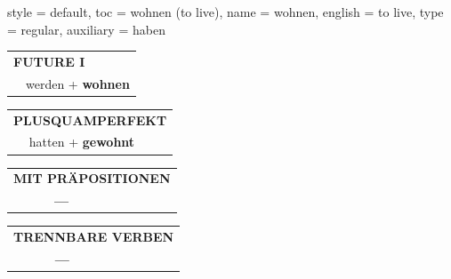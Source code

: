 \begin{verbentry}{
  style = {default},
  toc = {wohnen (to live)},
  name = {wohnen},
  english = {to live},
  type = {regular},
  auxiliary = {haben}
}
\begin{tabular}{rl}
    \multicolumn{2}{l}{\textbf{FUTURE I} }\\
  &  werden + \textbf{wohnen}\\
 
  \end{tabular}
\hfill
   \begin{tabular}{rl}
      \multicolumn{2}{l}{\textbf{PLUSQUAMPERFEKT}}\\
   & hatten + \textbf{gewohnt}\\
  \end{tabular}
  
  \vspace{10pt}



\begin{tabular}{lll}
\multicolumn{3}{l}{\textbf{MIT PRÄPOSITIONEN}}\\
& \textbf{---} & \\
\end{tabular}
\hfill
\begin{tabular}{lll}
\multicolumn{3}{l}{\textbf{TRENNBARE VERBEN}}\\
& \textbf{---} & \\
\end{tabular}

  \vspace{-5pt}
\end{verbentry}
